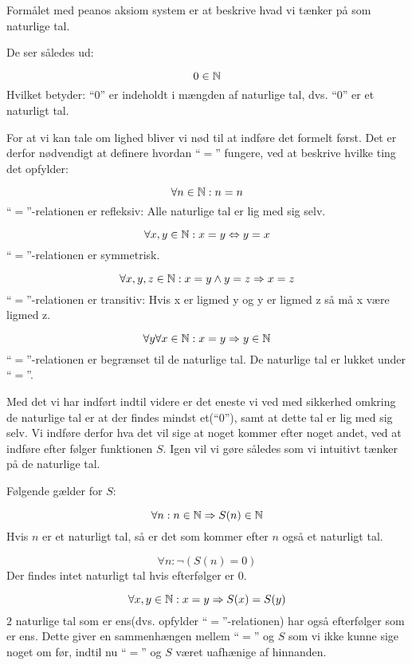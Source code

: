 Formålet med peanos aksiom system er at beskrive hvad vi tænker på som naturlige tal.

De ser således ud:

\[ 0 \in \mathbb{N} \]
Hvilket betyder: ``$0$'' er indeholdt i mængden af naturlige tal, dvs. ``$0$'' er et naturligt tal.

For at vi kan tale om lighed bliver vi nød til at indføre det formelt først.
Det er derfor nødvendigt at definere hvordan ``$=$'' fungere, ved at beskrive hvilke ting det opfylder:

\[ \forall n \in \mathbb{N}: n = n \]
``$=$''-relationen er refleksiv: Alle naturlige tal er lig med sig selv.

\[ \forall x,y \in \mathbb{N}: x = y \Leftrightarrow y = x \]
``$=$''-relationen er symmetrisk.

\[ \forall x,y,z \in \mathbb{N}: x = y \land y = z \Rightarrow x = z \]
``$=$''-relationen er transitiv: Hvis x er ligmed y og y er ligmed z så må x være ligmed z.

\[ \forall y \forall x \in \mathbb{N}: x = y \Rightarrow y \in \mathbb{N} \]
``$=$''-relationen er begrænset til de naturlige tal. De naturlige tal er lukket under ``$=$''.


Med det vi har indført indtil videre er det eneste vi ved med sikkerhed omkring de naturlige tal er at der findes mindst et(``0''),
samt at dette tal er lig med sig selv. Vi indføre derfor hva det vil sige at noget kommer efter noget andet,
ved at indføre efter følger funktionen $S$. Igen vil vi gøre således som vi intuitivt tænker på de naturlige tal.

Følgende gælder for $S$:

\[ \forall n: n \in \mathbb{N} \Rightarrow S(n) \in \mathbb{N} \]
Hvis $n$ er et naturligt tal, så er det som kommer efter $n$ også et naturligt tal.

\[ \forall n: \neg (S(n) = 0) \]
Der findes intet naturligt tal hvis efterfølger er $0$.

\[ \forall x, y \in \mathbb{N}: x = y \Rightarrow S(x) = S(y) \]
$2$ naturlige tal som er ens(dvs. opfylder ``$=$''-relationen) har også efterfølger som er ens.
Dette giver en sammenhængen mellem ``$=$'' og $S$ som vi ikke kunne sige noget om før,
indtil nu ``$=$'' og $S$ været uafhænige af hinnanden.

 

